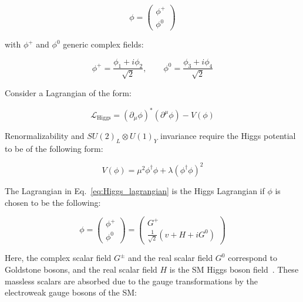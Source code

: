 			\begin{equation}
			\label{eq:Higgs_field}
				\phi = 
				\begin{pmatrix}
					\phi^+ \\ \phi^0
				\end{pmatrix} 
			\end{equation}

			\noindent with $\phi^+$ and $\phi^0$ generic complex fields: 

			\begin{equation}
				\phi^+ = \frac{\phi_1 + i \phi_2}{\sqrt{2}},  \qquad \phi^0 = \frac{\phi_3 + i \phi_4}{\sqrt{2}}
			\end{equation}

			\noindent Consider a Lagrangian of the form: 

			\begin{equation}
			\label{eq:Higgs_lagrangian}
				\mathcal{L_{\mathrm{Higgs}}} = ( \partial_{\mu} \phi )^* \left ( \partial^{\mu} \phi \right ) - V(\phi)
			\end{equation}

			\noindent Renormalizability and $SU(2)_L \otimes U(1)_Y$ invariance require the Higgs potential to be of the following form: 

			\begin{equation}
			\label{eq:Higgs_potential}
				V(\phi) = \mu^2  \phi^\dagger \phi + \lambda \left ( \phi^\dagger \phi \right )^2 
			\end{equation}

			\noindent The Lagrangian in Eq.~\ref{eq:Higgs_lagrangian} is the Higgs Lagrangian if $\phi$ is chosen to be the following:

			\begin{equation*}
				\phi = 
				\begin{pmatrix}
					\phi^+ \\ \phi^0
				\end{pmatrix} 
				=
				\begin{pmatrix}
					G^+ \\ \frac{1}{\sqrt{2}} \left ( v + H + iG^0 \right )
				\end{pmatrix}
			\end{equation*}

			\noindent Here, the complex scalar field $G^\pm$ and the real scalar field $G^0$ correspond to Goldstone bosons, and the real scalar field $H$ is the SM Higgs boson field~\cite{Goldstone1962}. These massless scalars are absorbed due to the gauge transformations by the electroweak gauge bosons of the SM:

